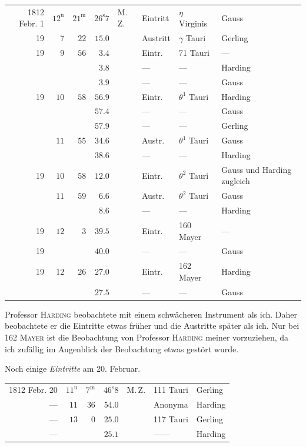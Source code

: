 \begin{center}\fontsize{9}{11}\selectfont\setlength{\tabcolsep}{1.8pt}\renewcommand{\arraystretch}{1.15}\begin{tabular}{rrrrllll}
1812 Febr. 1 & $12^{\mathrm u}$ & $21^{\mathrm m}$ & $26^{\mathrm s}7$ & M.\,Z. & Eintritt & $\eta$ Virginis & Gauss\\
19 & $7$ & $22$ & $15.0$ &  & Austritt & $\gamma$ Tauri & Gerling\\
19 & $9$ & $56$ & $3.4$ &  & Eintr. & 71 Tauri & —\\
 &  &  & $3.8$ &  & — & — & Harding\\
 &  &  & $3.9$ &  & — & — & Gauss\\
19 & $10$ & $58$ & $56.9$ &  & Eintr. & $\theta^1$ Tauri & Harding\\
 &  &  & $57.4$ &  & — & — & Gauss\\
 &  &  & $57.9$ &  & — & — & Gerling\\
 & $11$ & $55$ & $34.6$ &  & Austr. & $\theta^1$ Tauri & Gauss\\
 &  &  & $38.6$ &  & — & — & Harding\\
19 & $10$ & $58$ & $12.0$ &  & Eintr. & $\theta^2$ Tauri & Gauss und Harding zugleich\\
 & $11$ & $59$ & $6.6$ &  & Austr. & $\theta^2$ Tauri & Gauss\\
 &  &  & $8.6$ &  & — & — & Harding\\
19 & $12$ & $3$ & $39.5$ &  & Eintr. & 160 Mayer & —\\
19 &  &  & $40.0$ &  & — & — & Gauss\\
19 & $12$ & $26$ & $27.0$ &  & Eintr. & 162 Mayer & Harding\\
 &  &  & $27.5$ &  & — & — & Gauss\\
\end{tabular}\end{center}

\par\indent Professor \textsc{Harding} beobachtete mit einem schwächeren Instrument als ich. Daher beobachtete er die Eintritte etwas früher und die Austritte später als ich. Nur bei 162 \textsc{Mayer} ist die Beobachtung von Professor \textsc{Harding} meiner vorzuziehen, da ich zufällig im Augenblick der Beobachtung etwas gestört wurde.
\par\indent Noch einige \emph{Eintritte} am 20. Februar.

\begin{center}\fontsize{10}{12}\selectfont\setlength{\tabcolsep}{3pt}\renewcommand{\arraystretch}{1.15}\begin{tabular}{rrrrlll}
1812 Febr. 20 & $11^{\mathrm u}$ & $7^{\mathrm m}$ & $46^{\mathrm s}8$ & M.\,Z. & 111 Tauri & Gerling\\
— & $11$ & $36$ & $54.0$ &  & Anonyma & Harding\\
— & $13$ & $0$ & $25.0$ &  & 117 Tauri & Gerling\\
— &  &  & $25.1$ &  & —\quad — & Harding\\
\end{tabular}\end{center}
